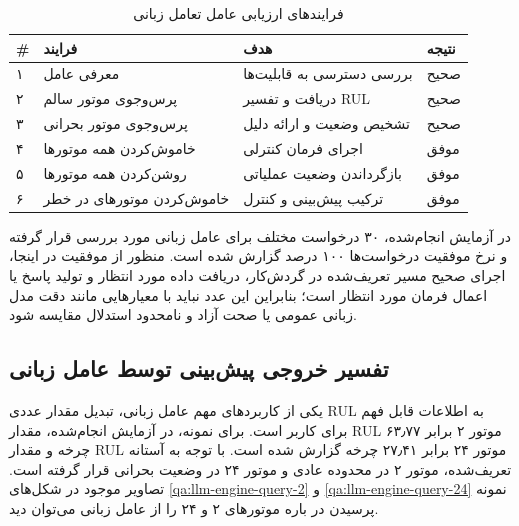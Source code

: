 \begin{table}[ht]
	\centering
	\caption{فرایند‌های ارزیابی عامل تعامل زبانی}
	\label{tab:llm-case-final}
	\begin{tabular}{p{0.6cm}p{3.3cm}p{5cm}p{3cm}}
		\toprule
		\textbf{\#} & \textbf{فرایند} & \textbf{هدف} & \textbf{نتیجه} \\
		\midrule
		۱ & معرفی عامل & بررسی دسترسی به قابلیت‌ها & صحیح \\
		۲ & پرس‌وجوی موتور سالم & دریافت و تفسیر \gls{RUL} & صحیح \\
		۳ & پرس‌وجوی موتور بحرانی & تشخیص وضعیت و ارائه دلیل & صحیح \\
		۴ & خاموش‌کردن همه موتورها & اجرای فرمان کنترلی & موفق \\
		۵ & روشن‌کردن همه موتورها & بازگرداندن وضعیت عملیاتی & موفق \\
		۶ & خاموش‌کردن موتورهای در خطر & ترکیب پیش‌بینی و کنترل & موفق \\
		\bottomrule
	\end{tabular}
\end{table}

در آزمایش انجام‌شده، ۳۰ درخواست مختلف برای عامل زبانی مورد بررسی قرار گرفته و نرخ موفقیت درخواست‌ها ۱۰۰ درصد گزارش شده است. منظور از موفقیت در اینجا، اجرای صحیح مسیر تعریف‌شده در گردش‌کار، دریافت داده مورد انتظار و تولید پاسخ یا اعمال فرمان مورد انتظار است؛ بنابراین این عدد نباید با معیارهایی مانند دقت مدل زبانی عمومی یا صحت آزاد و نامحدود استدلال مقایسه شود.

\subsection{تفسیر خروجی پیش‌بینی توسط عامل زبانی}

یکی از کاربردهای مهم عامل زبانی، تبدیل مقدار عددی \gls{RUL} به اطلاعات قابل فهم برای کاربر است. برای نمونه، در آزمایش انجام‌شده، مقدار \gls{RUL} موتور ۲ برابر ۶۳٫۷۷ چرخه و مقدار \gls{RUL} موتور ۲۴ برابر ۲۷٫۴۱ چرخه گزارش شده است. با توجه به آستانه تعریف‌شده، موتور ۲ در محدوده عادی و موتور ۲۴ در وضعیت بحرانی قرار گرفته است. تصاویر موجود در شکل‌های 
\ref{qa:llm-engine-query-2}
و
\ref{qa:llm-engine-query-24}
نمونه پرسیدن در باره موتور‌های ۲ و ۲۴ را از عامل زبانی می‌توان دید.


